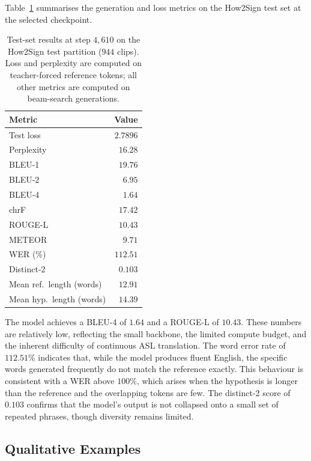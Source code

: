 \documentclass{article}
\begin{document}
Table~\ref{tab:test-results} summarises the generation and loss metrics on
the How2Sign test set at the selected checkpoint.

\begin{table}[H]
\centering
\caption{Test-set results at step $4{,}610$ on the How2Sign test partition
($944$ clips). Loss and perplexity are computed on teacher-forced reference
tokens; all other metrics are computed on beam-search generations.}
\label{tab:test-results}
\begin{tabular}{l r}
\toprule
Metric          & Value   \\
\midrule
Test loss       & $2.7896$ \\
Perplexity      & $16.28$  \\
\midrule
BLEU-1          & $19.76$  \\
BLEU-2          & $6.95$   \\
BLEU-4          & $1.64$   \\
chrF            & $17.42$  \\
ROUGE-L         & $10.43$  \\
METEOR          & $9.71$   \\
WER (\%)        & $112.51$ \\
Distinct-2      & $0.103$  \\
\midrule
Mean ref.\ length (words) & $12.91$ \\
Mean hyp.\ length (words) & $14.39$ \\
\bottomrule
\end{tabular}
\end{table}

The model achieves a BLEU-4 of $1.64$ and a ROUGE-L of $10.43$. These
numbers are relatively low, reflecting the small backbone, the
limited compute budget, and the inherent difficulty of continuous ASL
translation. The word error rate of $112.51\%$ indicates that, while the model
produces fluent English, the specific words generated frequently do not match
the reference exactly. This behaviour is consistent with a WER above $100\%$,
which arises when the hypothesis is longer than the reference and the
overlapping tokens are few. The distinct-2 score of $0.103$ confirms that the
model's output is not collapsed onto a small set of repeated phrases, though
diversity remains limited.

\subsection{Qualitative Examples}
\label{sec:results-qualitative}
\end{document}
